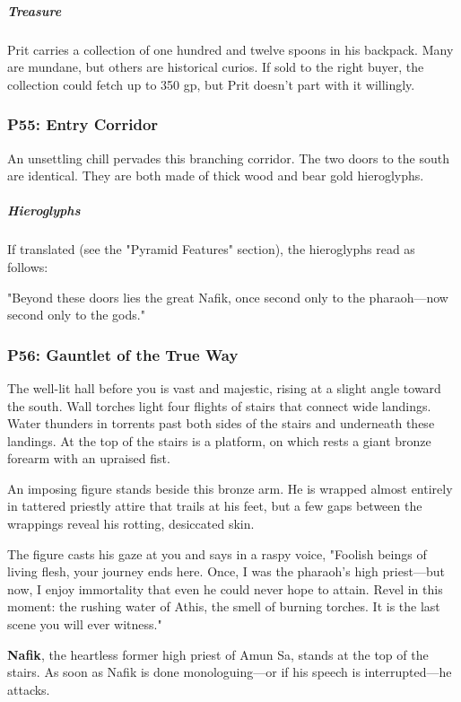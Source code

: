 \documentclass[10pt,a4paper,twoside,bg=print,twocolumn,openany,nodeprecatedcode]{dndbook}
\begin{document}
\subparagraph{Treasure}
Prit carries a collection of one hundred and twelve spoons in his backpack. Many are mundane, but others are historical curios. If sold to the right buyer, the collection could fetch up to 350 gp, but Prit doesn't part with it willingly.

\subsubsection{P55: Entry Corridor}
An unsettling chill pervades this branching corridor. The two doors to the south are identical. They are both made of thick wood and bear gold hieroglyphs.

\subparagraph{Hieroglyphs}
If translated (see the "Pyramid Features" section), the hieroglyphs read as follows:

\begin{DndReadAloud}{}
"Beyond these doors lies the great Nafik, once second only to the pharaoh—now second only to the gods."

\end{DndReadAloud}

\subsubsection{P56: Gauntlet of the True Way}
\begin{DndReadAloud}{}
The well-lit hall before you is vast and majestic, rising at a slight angle toward the south. Wall torches light four flights of stairs that connect wide landings. Water thunders in torrents past both sides of the stairs and underneath these landings. At the top of the stairs is a platform, on which rests a giant bronze forearm with an upraised fist.

An imposing figure stands beside this bronze arm. He is wrapped almost entirely in tattered priestly attire that trails at his feet, but a few gaps between the wrappings reveal his rotting, desiccated skin.

The figure casts his gaze at you and says in a raspy voice, "Foolish beings of living flesh, your journey ends here. Once, I was the pharaoh's high priest—but now, I enjoy immortality that even he could never hope to attain. Revel in this moment: the rushing water of Athis, the smell of burning torches. It is the last scene you will ever witness."

\end{DndReadAloud}

\textbf{Nafik}, the heartless former high priest of Amun Sa, stands at the top of the stairs. As soon as Nafik is done monologuing—or if his speech is interrupted—he attacks.
\end{document}
